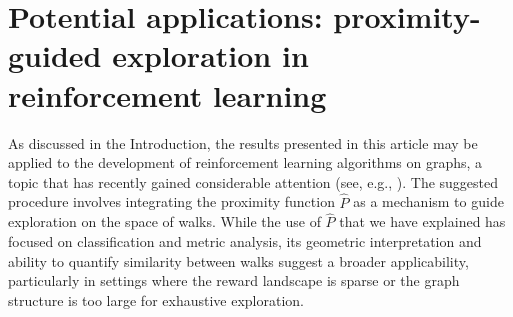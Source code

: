 \documentclass[preprint,12pt]{elsarticle}
\begin{document}



\section{Potential applications: proximity-guided exploration in reinforcement learning}

As discussed in the Introduction, the results presented in this article may be applied to the development of reinforcement learning algorithms on graphs, a topic that has recently gained considerable attention (see, e.g., \cite{jac,mei,nie}). The suggested procedure involves integrating the proximity function $\widehat{P}$ as a mechanism to guide exploration on the space of walks. While the use of $\widehat{P}$ that we have explained has focused on classification and metric analysis, its geometric interpretation and ability to quantify similarity between walks suggest a broader applicability, particularly in settings where the reward landscape is sparse or the graph structure is too large for exhaustive exploration.
\end{document}
